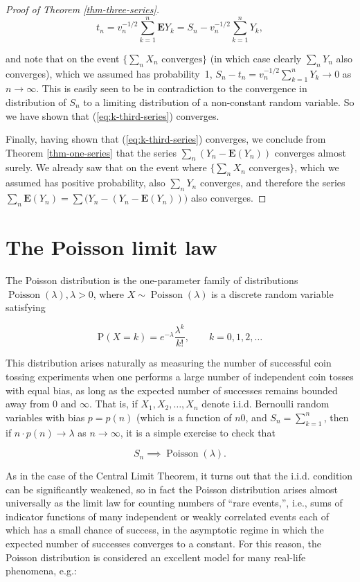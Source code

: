 \documentclass[11pt]{report}
\theoremstyle{plain}
\theoremstyle{definition}
\begin{document}
\begin{proof}[Proof of Theorem \ref{thm-three-series}]
\[
t_n = v_n^{-1/2} \sum_{k=1}^n \mathbf{E} Y_k = S_n - v_n^{-1/2}\sum_{k=1}^n Y_k,
\]

and note that on the event
$\{\sum_n X_n \textrm{ converges} \}$ (in which case
clearly $\sum_n Y_n$ also converges), which we
assumed has probability~1,
$S_n-t_n = v_n^{-1/2} \sum_{k=1}^n Y_k \to 0$ as
$n\to\infty$. This is easily seen to be in
contradiction to the convergence in distribution of
$S_n$ to a limiting distribution of a non-constant
random variable. So we have shown that
(\ref{eq:k-third-series}) converges.

Finally, having shown that (\ref{eq:k-third-series})
converges, we conclude from Theorem \ref{thm-one-series}
that the series
$\sum_n \left(Y_n-\mathbf{E}(Y_n)\right)$ converges
almost surely. We already saw that on the event where
$\{ \sum_n X_n \textrm{ converges}\}$, which we
assumed has positive probability, also $\sum_n Y_n$
converges, and therefore the series
$\sum_n \mathbf{E}(Y_n) = \sum \big(Y_n -
(Y_n-\mathbf{E}(Y_n))\big)$
also converges.
\end{proof}

\section{The Poisson limit law}
\label{sec:poisson-limit}
The Poisson distribution is the one-parameter family
of distributions
$\operatorname{Poisson}(\lambda), \lambda>0$, where
$X\sim \operatorname{Poisson}(\lambda)$ is a discrete
random variable satisfying

\[
\mathrm{P}(X=k) = e^{-\lambda} \frac{\lambda^k}{k!}, \qquad k=0,1,2,\ldots
\]

This distribution arises naturally as measuring the
number of successful coin tossing experiments when one
performs a large number of independent coin tosses
with equal bias, as long as the expected number of
successes remains bounded away from $0$ and $\infty$.
That is, if $X_1,X_2,\ldots,X_n$ denote i.i.d.
Bernoulli random variables with bias $p=p(n)$ (which
is a function of $n$0, and $S_n=\sum_{k=1}^n$, then
if $n\cdot p(n) \to \lambda$ as $n\to\infty$, it is a
simple exercise to check that

\begin{equation*}
\tag{30}\label{eq:law-small-numbers-iid}
S_n \implies \operatorname{Poisson}(\lambda).
\end{equation*}

As in the case of the Central Limit Theorem, it turns
out that the i.i.d. condition can be significantly
weakened, so in fact the Poisson distribution arises
almost universally as the limit law for counting
numbers of ``rare events,'', i.e., sums of indicator
functions of many independent or weakly correlated
events each of which has a small chance of success, in
the asymptotic regime in which the expected number of
successes converges to a constant. For this reason,
the Poisson distribution is considered an excellent
model for many real-life phenomena, e.g.:
\end{document}
